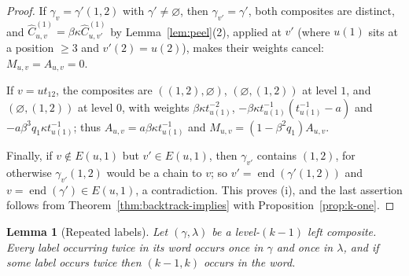 \documentclass[11pt]{article}
\newtheorem{lemma}[proposition]{Lemma}
\begin{document}
\begin{proof}
If $\gamma_v=\gamma'(1,2)$ with $\gamma'\neq\varnothing$, then
$\gamma_{v'}=\gamma'$, both composites are distinct, and
$\widehat C^{(1)}_{u,v}=\beta\kappa\widehat C^{(1)}_{u,v'}$ by
Lemma~\ref{lem:peel}(2), applied at $v'$ (where $u(1)$ sits at a
position $\geq3$ and $v'(2)=u(2)$), makes their weights cancel:
$M_{u,v}=A_{u,v}=0$.

If $v=ut_{12}$, the composites are $((1,2),\varnothing)$,
$(\varnothing,(1,2))$ at level $1$, and $(\varnothing,(1,2))$ at
level $0$, with weights $\beta\kappa t^{-2}_{u(1)}$,
$-\beta\kappa t^{-1}_{u(1)}(t^{-1}_{u(1)}-a)$ and
$-a\beta^3q_1\kappa t^{-1}_{u(1)}$; thus
$A_{u,v}=a\beta\kappa t^{-1}_{u(1)}$ and
$M_{u,v}=(1-\beta^2q_1)A_{u,v}$.

Finally, if $v\notin E(u,1)$ but $v'\in E(u,1)$, then $\gamma_{v'}$
contains $(1,2)$, for otherwise $\gamma_{v'}(1,2)$ would be a chain to
$v$; so $v'=\operatorname{end}(\gamma'(1,2))$ and
$v=\operatorname{end}(\gamma')\in E(u,1)$, a contradiction. This
proves (i), and the last assertion follows from
Theorem~\ref{thm:backtrack-implies} with Proposition~\ref{prop:k-one}.
\end{proof}

\begin{lemma}[Repeated labels]\label{lem:repeat}
Let $(\gamma,\lambda)$ be a level-$(k-1)$ left composite. Every label
occurring twice in its word occurs once in $\gamma$ and once in
$\lambda$, and if some label occurs twice then $(k-1,k)$ occurs in the
word.
\end{lemma}
\end{document}
